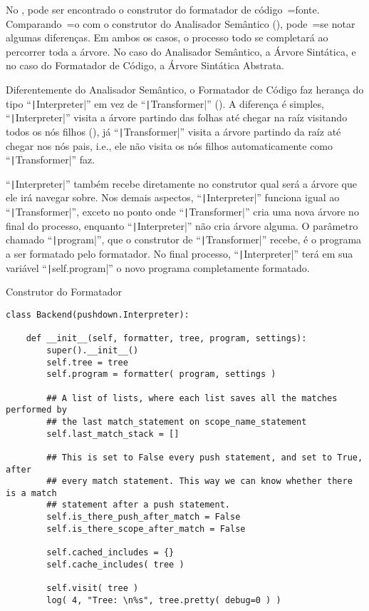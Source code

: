 No ,
pode ser encontrado o construtor do formatador de código~=fonte.
Comparando~=o com o construtor do Analisador Semântico (),
pode~=se notar algumas diferenças.
Em ambos os casos,
o processo todo se completará ao percorrer toda a árvore.
No caso do Analisador Semântico,
a Árvore Sintática,
e no caso do Formatador de Código,
a Árvore Sintática Abstrata.

Diferentemente do Analisador Semântico,
o Formatador de Código faz herança do tipo ``\texttt|Interpreter|'' em vez de ``\texttt|Transformer|'' ().
A diferença é simples,
``\texttt|Interpreter|'' visita a árvore partindo das folhas até chegar na raíz visitando todos os nós filhos (),
já ``\texttt|Transformer|'' visita a árvore partindo da raíz até chegar nos nós pais,
i.e.,
ele não visita os nós filhos automaticamente como ``\texttt|Transformer|'' faz.

``\texttt|Interpreter|'' também recebe diretamente no construtor qual será a árvore que ele irá navegar sobre.
Nos demais aspectos,
``\texttt|Interpreter|'' funciona igual ao ``\texttt|Transformer|'',
exceto no ponto onde ``\texttt|Transformer|'' cria uma nova árvore no final do processo,
enquanto ``\texttt|Interpreter|'' não cria árvore alguma.
O parâmetro chamado ``\texttt|program|'',
que o construtor de ``\texttt|Transformer|'' recebe,
é o programa a ser formatado pelo formatador.
No final processo,
``\texttt|Interpreter|'' terá em sua variável ``\texttt|self.program|'' o novo programa completamente formatado.
\begin{code}
\caption{Construtor do Formatador}
\label{code:construtorDoFormatador}
\begin{verbatim}
class Backend(pushdown.Interpreter):

    def __init__(self, formatter, tree, program, settings):
        super().__init__()
        self.tree = tree
        self.program = formatter( program, settings )

        ## A list of lists, where each list saves all the matches performed by
        ## the last match_statement on scope_name_statement
        self.last_match_stack = []

        ## This is set to False every push statement, and set to True, after
        ## every match statement. This way we can know whether there is a match
        ## statement after a push statement.
        self.is_there_push_after_match = False
        self.is_there_scope_after_match = False

        self.cached_includes = {}
        self.cache_includes( tree )

        self.visit( tree )
        log( 4, "Tree: \n%s", tree.pretty( debug=0 ) )
\end{verbatim}
\end{code}

